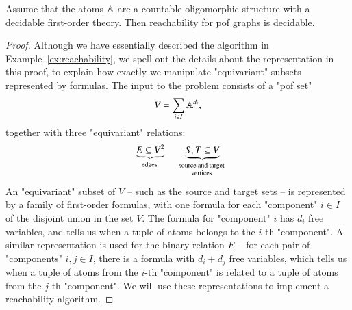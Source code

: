 \begin{theorem}\label{thm:olig-graph-reachability}
Assume that the atoms $\mathbb A$ are a countable oligomorphic structure with a decidable first-order theory. Then reachability for pof graphs is decidable. 
\end{theorem}
\begin{proof}
	Although we have essentially described the algorithm in Example~\ref{ex:reachability}, we spell out the details about the representation in this proof, to explain how exactly we manipulate "equivariant" subsets represented by formulas.
	The input to the problem consists of a "pof set"
	\begin{align*}
		V = \sum_{i \in I} \mathbb A^{d_i},
		\end{align*}	
	together with three "equivariant" relations: 
	\begin{align*}
	\myunderbrace{E \subseteq V^2}{edges} 
	\qquad 
	\myunderbrace{S,T \subseteq V}{source and target\\ vertices}
	\end{align*}
	An "equivariant" subset of $V$ -- such as the source and target sets -- is represented by a family of first-order formulas, with one formula for each "component" $i \in I$ of the disjoint union in the set $V$. The formula for "component" $i$ has $d_i$ free variables, and tells us when a tuple of atoms belongs to the $i$-th "component". A similar representation is used for the binary relation $E$ -- for each pair of "components" $i,j \in I$, there is a formula with $d_i+d_j$ free variables, which tells us when a tuple of atoms from the $i$-th "component" is related to a tuple of atoms from the $j$-th "component". We will use these representations to implement a reachability algorithm.


\end{proof}
